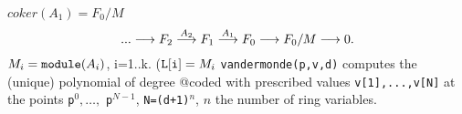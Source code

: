 $coker(A_1)=F_0/M$
$$...\longrightarrow F_2 \buildrel{A_2}\over{\longrightarrow} F_1 \buildrel{A_1}\over{\longrightarrow} F_0\longrightarrow F_0/M\longrightarrow 0.$$
$M_i={\tt module}(A_i)$, i=1..k.
(${\tt L[i]}=M_i$
{\tt vandermonde(p,v,d)} computes the (unique) polynomial of degree
@code{d} with prescribed values {\tt v[1],...,v[N]} at the points
{\tt p}$^0,\dots,$ {\tt p}$^{N-1}$, {\tt N=(d+1)}$^n$, $n$ the
number of ring variables.

